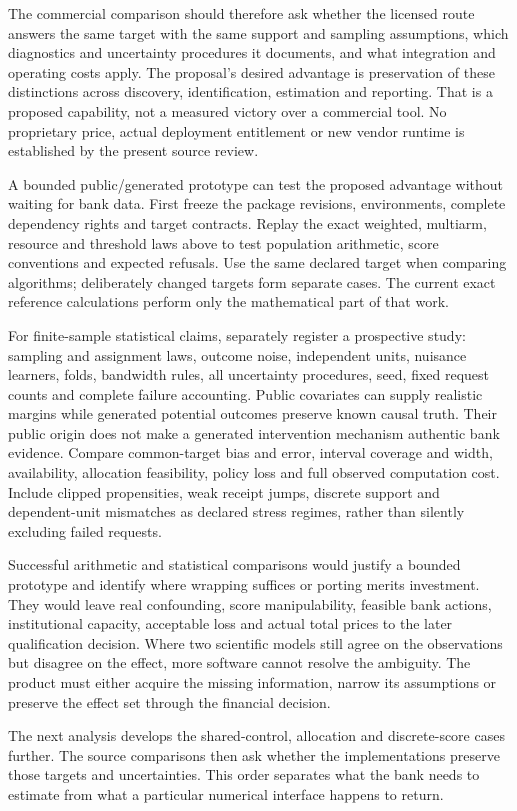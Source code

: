 The commercial comparison should therefore ask whether the licensed route
answers the same target with the same support and sampling assumptions, which
diagnostics and uncertainty procedures it documents, and what integration and
operating costs apply. The proposal's desired advantage is preservation of
these distinctions across discovery, identification, estimation and reporting.
That is a proposed capability, not a measured victory over a commercial tool.
No proprietary price, actual deployment entitlement or new vendor runtime is
established by the present source review.

A bounded public/generated prototype can test the proposed advantage without
waiting for bank data. First freeze the package revisions, environments,
complete dependency rights and target contracts. Replay the exact weighted,
multiarm, resource and threshold laws above to test population arithmetic,
score conventions and expected refusals. Use the same declared target when
comparing algorithms; deliberately changed targets form separate cases.
The current exact reference calculations perform only the mathematical
part of that work.~\citep{exec17_s4_design}

For finite-sample statistical claims, separately register a prospective study:
sampling and assignment laws, outcome noise, independent units, nuisance
learners, folds, bandwidth rules, all uncertainty procedures, seed, fixed
request counts and complete failure accounting. Public covariates can supply
realistic margins while generated potential outcomes preserve known causal
truth. Their public origin does not make a generated intervention mechanism
authentic bank evidence. Compare common-target bias and error, interval
coverage and width, availability, allocation feasibility, policy loss and full
observed computation cost. Include clipped propensities, weak receipt jumps,
discrete support and dependent-unit mismatches as declared stress regimes,
rather than silently excluding failed requests.

Successful arithmetic and statistical comparisons would justify a bounded
prototype and identify where wrapping suffices or porting merits investment.
They would leave real confounding, score manipulability, feasible bank actions,
institutional capacity, acceptable loss and actual total prices to the later
qualification decision. Where two scientific models still agree on the
observations but disagree on the effect, more software cannot resolve the
ambiguity. The product must either acquire the missing information, narrow
its assumptions or preserve the effect set through the financial decision.

The next analysis develops the shared-control, allocation and discrete-score
cases further. The source comparisons then ask whether the implementations
preserve those targets and uncertainties. This order separates what the bank
needs to estimate from what a particular numerical interface happens to return.
\label{exec17:s4-end}
